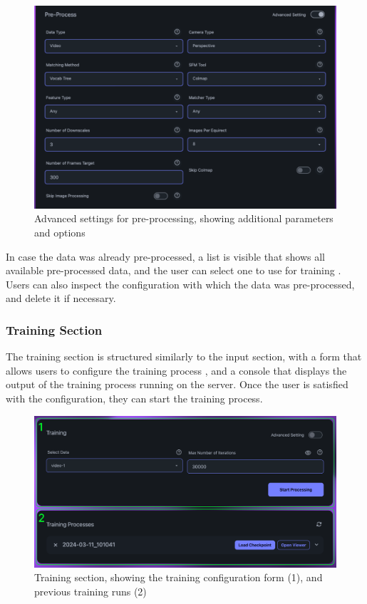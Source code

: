 \begin{figure}[h!]
  \centering
  \includegraphics[width=.65\textwidth]{figures/view-extended-options.png}
  \caption{Advanced settings for pre-processing, showing additional parameters and options}
  \label{fig:design:advanced-settings}
\end{figure}

In case the data was already pre-processed, a list is visible that shows all available pre-processed data, and the user can select one to use for training .
Users can also inspect the configuration with which the data was pre-processed, and delete it if necessary.

\subsubsection*{Training Section}

The training section is structured similarly to the input section, with a form that allows users to configure the training process , and a console that displays the output of the training process running on the server.
Once the user is satisfied with the configuration, they can start the training process.

\begin{figure}[h!]
  \centering
  \includegraphics[width=.65\textwidth]{figures/view-train.png}
  \caption{Training section, showing the training configuration form (1), and previous training runs (2)}
  \label{fig:design:training-section}
\end{figure}

